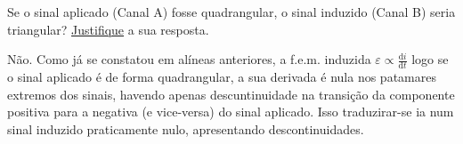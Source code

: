 \begin{parts}
\begin{subparts}
\subpart[20]
Se o sinal aplicado (Canal A) fosse quadrangular, o sinal induzido (Canal B) seria triangular? \underline{Justifique} a sua resposta.
\begin{solution}
N\~{a}o. Como j\'{a} se constatou em al\'{i}neas anteriores, a f.e.m. induzida $\varepsilon\propto\frac{\mathrm d i}{\mathrm d t}$ logo se o sinal aplicado \'{e} de forma quadrangular, a sua derivada \'{e} nula nos patamares extremos dos sinais, havendo apenas descuntinuidade na transi\c{c}\~{a}o da componente positiva para a negativa (e vice-versa) do sinal aplicado. Isso traduzirar-se ia num sinal induzido praticamente nulo, apresentando descontinuidades.
\end{solution}
\end{subparts}
\end{parts}